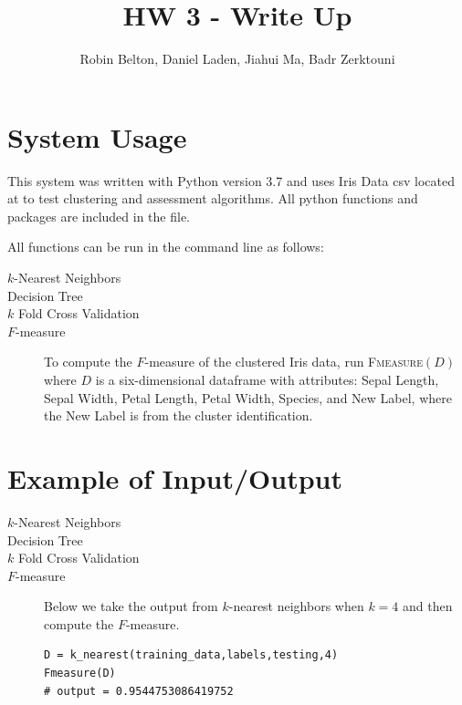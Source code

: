\documentclass[psamsfonts,onesided,10pt]{amsart}
\title{HW 3 - Write Up}
\author{Robin Belton, Daniel Laden, Jiahui Ma,  Badr Zerktouni}
\begin{document}
\maketitle

\section{System Usage}

This system was written with Python version 3.7 and uses Iris Data csv located at  
to test clustering and assessment algorithms. All python functions and packages are included in the  file.

All functions can be run in the command line as follows:

\begin{description}
\item[$k$-Nearest Neighbors] 
\item[Decision Tree] 
\item[$k$ Fold Cross Validation] 
\item[$F$-measure] To compute the $F$-measure of the clustered Iris data, run \textsc{Fmeasure}$(D)$ 
where $D$ is a six-dimensional dataframe with attributes: Sepal Length, Sepal Width, Petal Length, Petal Width,
              Species, and New Label, where the New Label is from the cluster identification. 
\end{description}
 
\section{Example of Input/Output}
\begin{description}
\item[$k$-Nearest Neighbors] \todo{}

\item[Decision Tree] \todo{}

\item[$k$ Fold Cross Validation] \todo{}

\item[$F$-measure] Below we take the output from $k$-nearest neighbors when $k=4$ and then compute the $F$-measure. 
\begin{verbatim}
D = k_nearest(training_data,labels,testing,4)
Fmeasure(D)
# output = 0.9544753086419752
\end{verbatim}
\end{description}
\end{document}
